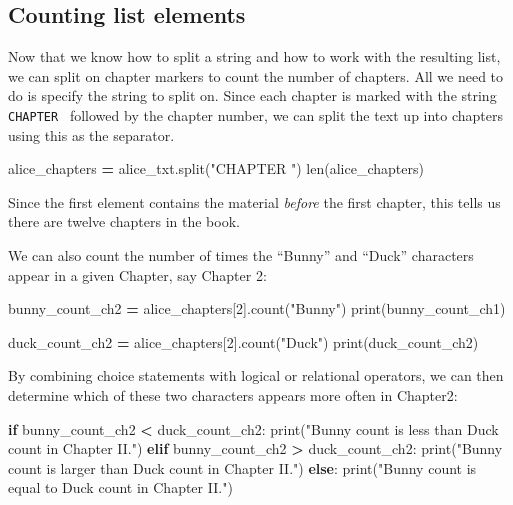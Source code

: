 \documentclass[]{book}
\newenvironment{Shaded}{\begin{snugshade}}{\end{snugshade}}
\newcommand{\DecValTok}[1]{\textcolor[rgb]{0.00,0.00,0.81}{#1}}
\newcommand{\StringTok}[1]{\textcolor[rgb]{0.31,0.60,0.02}{#1}}
\newcommand{\ControlFlowTok}[1]{\textcolor[rgb]{0.13,0.29,0.53}{\textbf{#1}}}
\newcommand{\OperatorTok}[1]{\textcolor[rgb]{0.81,0.36,0.00}{\textbf{#1}}}
\newcommand{\BuiltInTok}[1]{#1}
\newcommand{\NormalTok}[1]{#1}
\begin{document}
\subsection{Counting list elements}\label{counting-list-elements}

Now that we know how to split a string and how to work with the
resulting list, we can split on chapter markers to count the number of
chapters. All we need to do is specify the string to split on. Since
each chapter is marked with the string
\texttt{\textquotesingle{}CHAPTER\ \textquotesingle{}} followed by the
chapter number, we can split the text up into chapters using this as the
separator.

\begin{Shaded}
\begin{Highlighting}[]
\NormalTok{alice_chapters }\OperatorTok{=}\NormalTok{ alice_txt.split(}\StringTok{"CHAPTER "}\NormalTok{)}
\BuiltInTok{len}\NormalTok{(alice_chapters)}
\end{Highlighting}
\end{Shaded}

Since the first element contains the material \emph{before} the first
chapter, this tells us there are twelve chapters in the book.

We can also count the number of times the ``Bunny'' and ``Duck''
characters appear in a given Chapter, say Chapter 2:

\begin{Shaded}
\begin{Highlighting}[]
\NormalTok{bunny_count_ch2 }\OperatorTok{=}\NormalTok{ alice_chapters[}\DecValTok{2}\NormalTok{].count(}\StringTok{"Bunny"}\NormalTok{)}
\BuiltInTok{print}\NormalTok{(bunny_count_ch1)}

\NormalTok{duck_count_ch2 }\OperatorTok{=}\NormalTok{ alice_chapters[}\DecValTok{2}\NormalTok{].count(}\StringTok{"Duck"}\NormalTok{)}
\BuiltInTok{print}\NormalTok{(duck_count_ch2)}
\end{Highlighting}
\end{Shaded}

By combining choice statements with logical or relational operators, we
can then determine which of these two characters appears more often in
Chapter2:

\begin{Shaded}
\begin{Highlighting}[]
\ControlFlowTok{if}\NormalTok{ bunny_count_ch2 }\OperatorTok{<}\NormalTok{ duck_count_ch2:}
    \BuiltInTok{print}\NormalTok{(}\StringTok{"Bunny count is less than Duck count in Chapter II."}\NormalTok{)}
\ControlFlowTok{elif}\NormalTok{ bunny_count_ch2 }\OperatorTok{>}\NormalTok{ duck_count_ch2:}
    \BuiltInTok{print}\NormalTok{(}\StringTok{"Bunny count is larger than Duck count in Chapter II."}\NormalTok{)}
\ControlFlowTok{else}\NormalTok{:}
    \BuiltInTok{print}\NormalTok{(}\StringTok{"Bunny count is equal to Duck count in Chapter II."}\NormalTok{)}
\end{Highlighting}
\end{Shaded}
\end{document}
